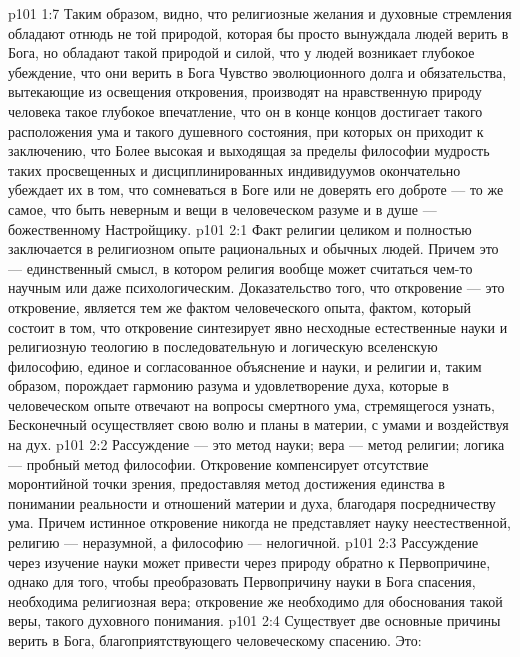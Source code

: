 \vs p101 1:7 Таким образом, видно, что религиозные желания и духовные стремления обладают отнюдь не той природой, которая бы просто вынуждала людей  верить в Бога, но обладают такой природой и силой, что у людей возникает глубокое убеждение, что они верить в Бога  Чувство эволюционного долга и обязательства, вытекающие из освещения откровения, производят на нравственную природу человека такое глубокое впечатление, что он в конце концов достигает такого расположения ума и такого душевного состояния, при которых он приходит к заключению, что  Более высокая и выходящая за пределы философии мудрость таких просвещенных и дисциплинированных индивидуумов окончательно убеждает их в том, что сомневаться в Боге или не доверять его доброте --- то же самое, что быть неверным  и  вещи в человеческом разуме и в душе --- божественному Настройщику.
\vs p101 2:1 Факт религии целиком и полностью заключается в религиозном опыте рациональных и обычных людей. Причем это --- единственный смысл, в котором религия вообще может считаться чем\hyp{}то научным или даже психологическим. Доказательство того, что откровение --- это откровение, является тем же фактом человеческого опыта, фактом, который состоит в том, что откровение синтезирует явно несходные естественные науки и религиозную теологию в последовательную и логическую вселенскую философию, единое и согласованное объяснение и науки, и религии и, таким образом, порождает гармонию разума и удовлетворение духа, которые в человеческом опыте отвечают на вопросы смертного ума, стремящегося узнать,  Бесконечный осуществляет свою волю и планы в материи, с умами и воздействуя на дух.
\vs p101 2:2 Рассуждение --- это метод науки; вера --- метод религии; логика --- пробный метод философии. Откровение компенсирует отсутствие моронтийной точки зрения, предоставляя метод достижения единства в понимании реальности и отношений материи и духа, благодаря посредничеству ума. Причем истинное откровение никогда не представляет науку неестественной, религию --- неразумной, а философию --- нелогичной.
\vs p101 2:3 Рассуждение через изучение науки может привести через природу обратно к Первопричине, однако для того, чтобы преобразовать Первопричину науки в Бога спасения, необходима религиозная вера; откровение же необходимо для обоснования такой веры, такого духовного понимания.
\vs p101 2:4 Существует две основные причины верить в Бога, благоприятствующего человеческому спасению. Это:
